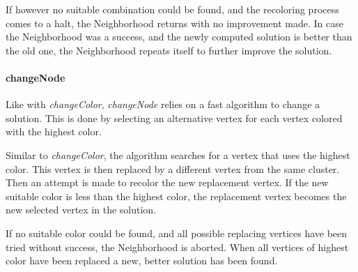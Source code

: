 \documentclass[paper=a4,fontsize=12pt]{scrartcl}
\begin{document}
If however no suitable combination could be found, and the recoloring process comes to a halt, the Neighborhood returns with no improvement made. In case the Neighborhood was a success, and the newly computed solution is better than the old one, the Neighborhood repeats itself to further improve the solution.



\paragraph{changeNode}
Like with \emph{changeColor}, \emph{changeNode} relies on a fast algorithm to change a solution. This is done by selecting an alternative vertex for each vertex colored with the highest color.


Similar to \emph{changeColor}, the algorithm searches for a vertex that uses the highest color. This vertex is then replaced by a different vertex from the same cluster. Then an attempt is made to recolor the new replacement vertex. If the new suitable color is less than the highest color, the replacement vertex becomes the new selected vertex in the solution. 


If no suitable color could be found, and all possible replacing vertices have been tried without success, the Neighborhood is aborted. When all vertices of highest color have been replaced a new, better solution has been found.
\end{document}
